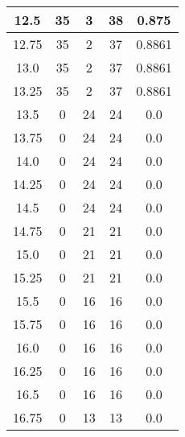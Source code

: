 \documentclass[letterpaper, 12pt]{article}
\begin{document}
\begin{longtable}{|c|c|c|c|c|}
12.5 & 35 & 3 & 38 & 0.875 \\
\hline
12.75 & 35 & 2 & 37 & 0.8861 \\
\hline
13.0 & 35 & 2 & 37 & 0.8861 \\
\hline
13.25 & 35 & 2 & 37 & 0.8861 \\
\hline
13.5 & 0 & 24 & 24 & 0.0 \\
\hline
13.75 & 0 & 24 & 24 & 0.0 \\
\hline
14.0 & 0 & 24 & 24 & 0.0 \\
\hline
14.25 & 0 & 24 & 24 & 0.0 \\
\hline
14.5 & 0 & 24 & 24 & 0.0 \\
\hline
14.75 & 0 & 21 & 21 & 0.0 \\
\hline
15.0 & 0 & 21 & 21 & 0.0 \\
\hline
15.25 & 0 & 21 & 21 & 0.0 \\
\hline
15.5 & 0 & 16 & 16 & 0.0 \\
\hline
15.75 & 0 & 16 & 16 & 0.0 \\
\hline
16.0 & 0 & 16 & 16 & 0.0 \\
\hline
16.25 & 0 & 16 & 16 & 0.0 \\
\hline
16.5 & 0 & 16 & 16 & 0.0 \\
\hline
16.75 & 0 & 13 & 13 & 0.0 \\
\hline
\end{longtable}
\end{document}
